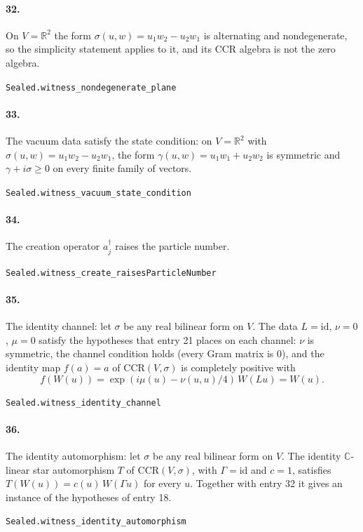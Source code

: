 \documentclass[11pt]{article}
\begin{document}
\paragraph{32.} On $V = \mathbb R^2$ the form $\sigma(u, w) = u_1 w_2 - u_2 w_1$ is alternating and nondegenerate, so the simplicity statement applies to it, and its CCR algebra is not the zero algebra.\par{\footnotesize\texttt{Sealed.witness\_nondegenerate\_plane}}

\paragraph{33.} The vacuum data satisfy the state condition: on $V = \mathbb R^2$ with $\sigma(u, w) = u_1 w_2 - u_2 w_1$, the form $\gamma(u, w) = u_1 w_1 + u_2 w_2$ is symmetric and $\gamma + i\sigma \ge 0$ on every finite family of vectors.\par{\footnotesize\texttt{Sealed.witness\_vacuum\_state\_condition}}

\paragraph{34.} The creation operator $a_j^\dagger$ raises the particle number.\par{\footnotesize\texttt{Sealed.witness\_create\_raisesParticleNumber}}

\paragraph{35.} The identity channel: let $\sigma$ be any real bilinear form on $V$. The data $L = \mathrm{id}$, $\nu = 0$, $\mu = 0$ satisfy the hypotheses that entry 21 places on each channel: $\nu$ is symmetric, the channel condition holds (every Gram matrix is $0$), and the identity map $f(a) = a$ of $\mathrm{CCR}(V, \sigma)$ is completely positive with \[f(W(u)) = \exp(i\mu(u) - \nu(u, u)/4)\, W(Lu) = W(u).\]\par{\footnotesize\texttt{Sealed.witness\_identity\_channel}}

\paragraph{36.} The identity automorphism: let $\sigma$ be any real bilinear form on $V$. The identity $\mathbb C$-linear star automorphism $T$ of $\mathrm{CCR}(V, \sigma)$, with $\Gamma = \mathrm{id}$ and $c = 1$, satisfies $T(W(u)) = c(u)\, W(\Gamma u)$ for every $u$. Together with entry 32 it gives an instance of the hypotheses of entry 18.\par{\footnotesize\texttt{Sealed.witness\_identity\_automorphism}}
\end{document}
